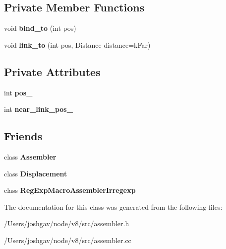 \subsection*{Private Member Functions}
\begin{DoxyCompactItemize}
\item 
void {\bfseries bind\+\_\+to} (int pos)\hypertarget{classv8_1_1internal_1_1_label_a86c383a31b669cd3773149d6fd4a2032}{}\label{classv8_1_1internal_1_1_label_a86c383a31b669cd3773149d6fd4a2032}

\item 
void {\bfseries link\+\_\+to} (int pos, Distance distance=k\+Far)\hypertarget{classv8_1_1internal_1_1_label_a3c5cddca62f146a48341dc7ac32c150f}{}\label{classv8_1_1internal_1_1_label_a3c5cddca62f146a48341dc7ac32c150f}

\end{DoxyCompactItemize}
\subsection*{Private Attributes}
\begin{DoxyCompactItemize}
\item 
int {\bfseries pos\+\_\+}\hypertarget{classv8_1_1internal_1_1_label_a4f597e255c0a513c5d1ec4906a072a9e}{}\label{classv8_1_1internal_1_1_label_a4f597e255c0a513c5d1ec4906a072a9e}

\item 
int {\bfseries near\+\_\+link\+\_\+pos\+\_\+}\hypertarget{classv8_1_1internal_1_1_label_a57981c9e5031f35cb32da49ef9f1e421}{}\label{classv8_1_1internal_1_1_label_a57981c9e5031f35cb32da49ef9f1e421}

\end{DoxyCompactItemize}
\subsection*{Friends}
\begin{DoxyCompactItemize}
\item 
class {\bfseries Assembler}\hypertarget{classv8_1_1internal_1_1_label_a08829e094e460cdd0df495c883c39ce2}{}\label{classv8_1_1internal_1_1_label_a08829e094e460cdd0df495c883c39ce2}

\item 
class {\bfseries Displacement}\hypertarget{classv8_1_1internal_1_1_label_a14d5cd48e152856eb738eaee8144d357}{}\label{classv8_1_1internal_1_1_label_a14d5cd48e152856eb738eaee8144d357}

\item 
class {\bfseries Reg\+Exp\+Macro\+Assembler\+Irregexp}\hypertarget{classv8_1_1internal_1_1_label_a759a5177df4b99390b15abe3f6636449}{}\label{classv8_1_1internal_1_1_label_a759a5177df4b99390b15abe3f6636449}

\end{DoxyCompactItemize}


The documentation for this class was generated from the following files\+:\begin{DoxyCompactItemize}
\item 
/\+Users/joshgav/node/v8/src/assembler.\+h\item 
/\+Users/joshgav/node/v8/src/assembler.\+cc\end{DoxyCompactItemize}

